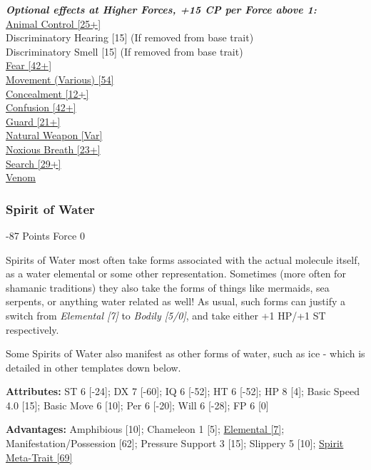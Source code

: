 \begin{multicols}{3}
	\textbf{\textit{Optional effects at Higher Forces, +15 CP per Force above 1:\\}}
	\hyperref[animal_control]{Animal Control [25+]}\\
	Discriminatory Hearing [15] (If removed from base trait)\\
	Discriminatory Smell [15] (If removed from base trait)\\
	\hyperref[fear]{Fear [42+]}\\
	\hyperref[movement]{Movement (Various) [54]}\\
	\hyperref[concealment]{Concealment [12+]}\\
	\hyperref[confusion]{Confusion [42+]}\\
	\hyperref[guard]{Guard [21+]}\\
	\hyperref[natural_weapon]{Natural Weapon [Var]}\\
	\hyperref[noxious_breath]{Noxious Breath [23+]}\\
	\hyperref[search]{Search [29+]}\\
	\hyperref[venom]{Venom}\\
	
	\subsubsection{Spirit of Water}
	\begin{flushright}
		-87 Points Force 0
	\end{flushright}
	
	Spirits of Water most often take forms associated with the actual molecule itself, as a water elemental or some other representation. Sometimes (more often for shamanic traditions) they also take the forms of things like mermaids, sea serpents, or anything water related as well! As usual, such forms can justify a switch from \textit{Elemental [7]} to \textit{Bodily [5/0]}, and take either +1 HP/+1 ST respectively. 
	
	Some Spirits of Water also manifest as other forms of water, such as ice - which is detailed in other templates down below.
	
	\textbf{Attributes:}
	ST 6 [-24]; DX 7 [-60]; IQ 6 [-52]; HT 6 [-52]; HP 8 [4]; Basic Speed 4.0 [15]; Basic Move 6 [10]; Per 6 [-20]; Will 6 [-28]; FP 6 [0]
	
	\textbf{Advantages:}
	Amphibious [10]; Chameleon 1 [5]; \hyperref[elemental]{Elemental [7]}; Manifestation/Possession [62]; Pressure Support 3 [15]; Slippery 5 [10]; \hyperref[spirit_meta_trait]{Spirit Meta-Trait [69]}
	

\end{multicols}
